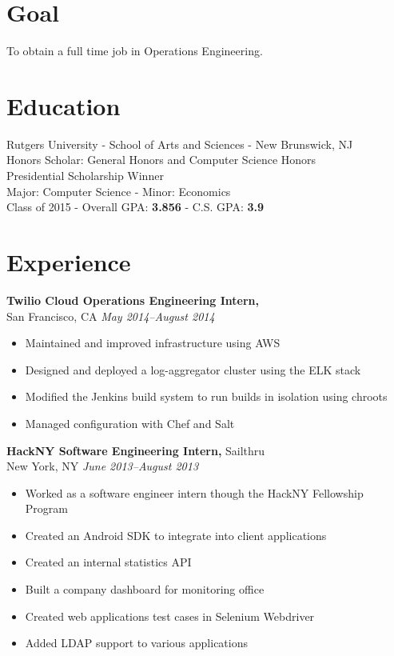 \documentclass[margin]{res}
\begin{document}
 
\begin{resume} 

\section{Goal}
To obtain a full time job in Operations Engineering.
 
\section{Education} 
Rutgers University - School of Arts and Sciences - New Brunswick, NJ\\
Honors Scholar: General Honors and Computer Science Honors\\
Presidential Scholarship Winner\\
Major: Computer Science - Minor: Economics\\
Class of 2015 - Overall GPA: {\bf 3.856} - C.S. GPA: {\bf 3.9}

\section{Experience}

{\bf Twilio Cloud Operations Engineering Intern,}\\
San Francisco, CA \textit{May 2014--August 2014}
\begin{itemize} \itemsep -2pt
    \item Maintained and improved infrastructure using AWS
    \item Designed and deployed a log-aggregator cluster using the ELK stack
    \item Modified the Jenkins build system to run builds in isolation using
    chroots
    \item Managed configuration with Chef and Salt
\end{itemize}

{\bf HackNY Software Engineering Intern,} Sailthru\\
New York, NY \textit{June 2013--August 2013}
\begin{itemize} \itemsep -2pt
    \item Worked as a software engineer intern though the HackNY Fellowship
    Program
    \item Created an Android SDK to integrate into client applications
    \item Created an internal statistics API
    \item Built a company dashboard for monitoring office
    \item Created web applications test cases in Selenium Webdriver
    \item Added LDAP support to various applications
\end{itemize}



\end{resume}
\end{document}
